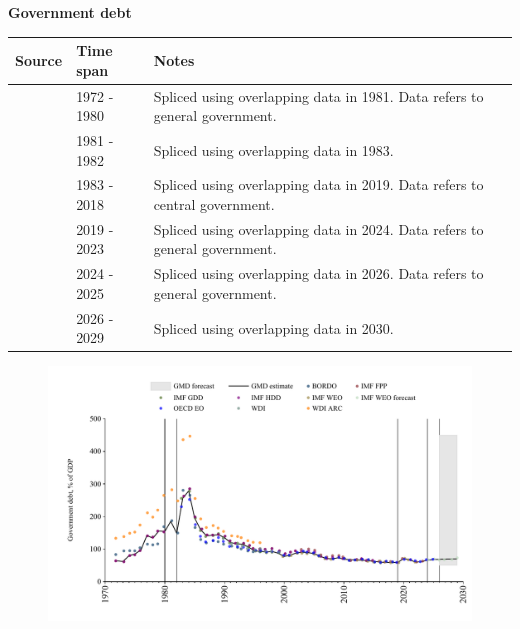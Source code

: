 \documentclass[12pt,a4paper,landscape]{article}
\begin{document}
\begin{adjustbox}{max totalsize={\paperwidth}{\paperheight},center}
\begin{minipage}[t][\textheight][t]{\textwidth}
\vspace*{0.5cm}
{}
\begin{center}
{\Large\bfseries Government debt}
\end{center}
\vspace{0.5cm}
\begin{table}[H]
\centering
\small
\begin{tabular}{|l|l|l|}
\hline
\textbf{Source} & \textbf{Time span} & \textbf{Notes} \\
\hline
\rowcolor{white}\cite{IMF_FPP}& 1972 - 1980 &Spliced using overlapping data in 1981. Data refers to general government.\\
\rowcolor{lightgray}\cite{BORDO}& 1981 - 1982 &Spliced using overlapping data in 1983. \\
\rowcolor{white}\cite{IMF_GDD}& 1983 - 2018 &Spliced using overlapping data in 2019. Data refers to central government.\\
\rowcolor{lightgray}\cite{IMF_FPP}& 2019 - 2023 &Spliced using overlapping data in 2024. Data refers to general government.\\
\rowcolor{white}\cite{OECD_EO}& 2024 - 2025 &Spliced using overlapping data in 2026. Data refers to general government.\\
\rowcolor{lightgray}\cite{IMF_WEO_forecast}& 2026 - 2029 &Spliced using overlapping data in 2030. \\
\hline
\end{tabular}
\end{table}
\begin{figure}[H]
\centering
\includegraphics[width=\textwidth,height=0.6\textheight,keepaspectratio]{graphs/ISR_govdebt_GDP.pdf}
\end{figure}
\end{minipage}
\end{adjustbox}
\end{document}
